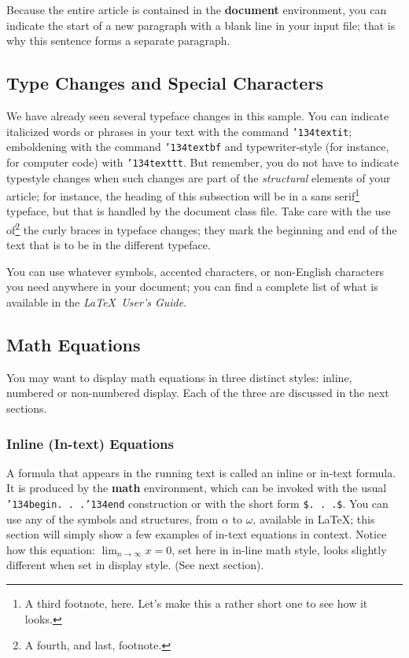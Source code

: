 \documentclass{sig-alternate-05-2015}
\begin{document}
Because the entire article is contained in
the \textbf{document} environment, you can indicate the
start of a new paragraph with a blank line in your
input file; that is why this sentence forms a separate paragraph.

\subsection{Type Changes and {\subsecit Special} Characters}
We have already seen several typeface changes in this sample.  You
can indicate italicized words or phrases in your text with
the command \texttt{{\char'134}textit}; emboldening with the
command \texttt{{\char'134}textbf}
and typewriter-style (for instance, for computer code) with
\texttt{{\char'134}texttt}.  But remember, you do not
have to indicate typestyle changes when such changes are
part of the \textit{structural} elements of your
article; for instance, the heading of this subsection will
be in a sans serif\footnote{A third footnote, here.
Let's make this a rather short one to
see how it looks.} typeface, but that is handled by the
document class file. Take care with the use
of\footnote{A fourth, and last, footnote.}
the curly braces in typeface changes; they mark
the beginning and end of
the text that is to be in the different typeface.

You can use whatever symbols, accented characters, or
non-English characters you need anywhere in your document;
you can find a complete list of what is
available in the \textit{\LaTeX\
User's Guide}\cite{Lamport:LaTeX}.

\subsection{Math Equations}
You may want to display math equations in three distinct styles:
inline, numbered or non-numbered display.  Each of
the three are discussed in the next sections.

\subsubsection{Inline (In-text) Equations}
A formula that appears in the running text is called an
inline or in-text formula.  It is produced by the
\textbf{math} environment, which can be
invoked with the usual \texttt{{\char'134}begin. . .{\char'134}end}
construction or with the short form \texttt{\$. . .\$}. You
can use any of the symbols and structures,
from $\alpha$ to $\omega$, available in
\LaTeX\cite{Lamport:LaTeX}; this section will simply show a
few examples of in-text equations in context. Notice how
this equation: \begin{math}\lim_{n\rightarrow \infty}x=0\end{math},
set here in in-line math style, looks slightly different when
set in display style.  (See next section).
\end{document}
